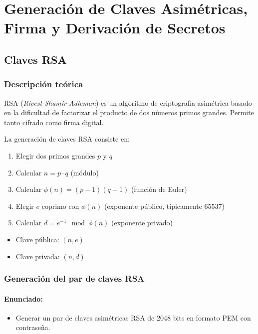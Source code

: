 \chapter{Generación de Claves Asimétricas, Firma y Derivación de Secretos}

\section{Claves RSA}

\subsection{Descripción teórica}

RSA (\textit{Rivest-Shamir-Adleman}) es un algoritmo de criptografía asimétrica basado en la dificultad de factorizar el producto de dos números primos grandes. Permite tanto cifrado como firma digital.

La generación de claves RSA consiste en:

\begin{enumerate}
    \item Elegir dos primos grandes $p$ y $q$
    \item Calcular $n = p \cdot q$ (módulo)
    \item Calcular $\phi(n) = (p-1)(q-1)$ (función de Euler)
    \item Elegir $e$ coprimo con $\phi(n)$ (exponente público, típicamente 65537)
    \item Calcular $d = e^{-1} \mod \phi(n)$ (exponente privado)
\end{enumerate}

\begin{itemize}[label=\textbullet]
    \item Clave pública: $(n, e)$
    \item Clave privada: $(n, d)$
\end{itemize}

\subsection{Generación del par de claves RSA}
\subsubsection{Enunciado:}
\begin{itemize}[label=\textbullet]
    \item Generar un par de claves asimétricas RSA de 2048 bits en formato PEM con contraseña.
\end{itemize}

